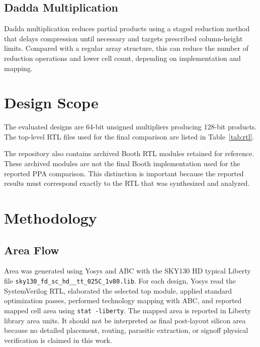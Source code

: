 \documentclass[conference]{IEEEtran}
\begin{document}
\subsection{Dadda Multiplication}
Dadda multiplication reduces partial products using a staged reduction method that delays compression until necessary and targets prescribed column-height limits. Compared with a regular array structure, this can reduce the number of reduction operations and lower cell count, depending on implementation and mapping.

\section{Design Scope}

The evaluated designs are 64-bit unsigned multipliers producing 128-bit products. The top-level RTL files used for the final comparison are listed in Table~\ref{tab:rtl}.

\begin{table}[t]
\centering
\caption{RTL Designs Used in Final Evaluation}
\label{tab:rtl}
\scriptsize
{}
\end{table}

The repository also contains archived Booth RTL modules retained for reference. These archived modules are not the final Booth implementation used for the reported PPA comparison. This distinction is important because the reported results must correspond exactly to the RTL that was synthesized and analyzed.

\section{Methodology}

\subsection{Area Flow}
Area was generated using Yosys and ABC with the SKY130 HD typical Liberty file \texttt{sky130\_fd\_sc\_hd\_\_tt\_025C\_1v80.lib}. For each design, Yosys read the SystemVerilog RTL, elaborated the selected top module, applied standard optimization passes, performed technology mapping with ABC, and reported mapped cell area using \texttt{stat -liberty}. The mapped area is reported in Liberty library area units. It should not be interpreted as final post-layout silicon area because no detailed placement, routing, parasitic extraction, or signoff physical verification is claimed in this work.
\end{document}
